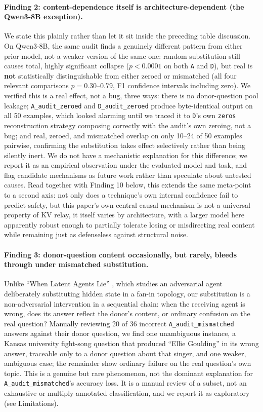 \documentclass[11pt]{article}
\begin{document}
\paragraph{Finding 2: content-dependence itself is architecture-dependent
(the Qwen3-8B exception).} We state this plainly rather than let it sit
inside the preceding table discussion. On Qwen3-8B, the same audit finds
a genuinely different pattern from either prior model, not a weaker
version of the same one: random substitution still causes total, highly
significant collapse ($p<0.0001$ on both \texttt{A} and \texttt{D}), but
real is \textbf{not} statistically distinguishable from either zeroed or
mismatched (all four relevant comparisons $p=0.30$--$0.79$, F1 confidence
intervals including zero). We verified this is a real effect, not a bug,
three ways: there is no donor-question pool leakage; \texttt{A\_audit\_zeroed}
and \texttt{D\_audit\_zeroed} produce byte-identical output on all 50
examples, which looked alarming until we traced it to \texttt{D}'s own
\texttt{zeros} reconstruction strategy composing correctly with the
audit's own zeroing, not a bug; and real, zeroed, and mismatched overlap
on only 10--24 of 50 examples pairwise, confirming the substitution takes
effect selectively rather than being silently inert. We do not have a
mechanistic explanation for this difference; we report it as an empirical
observation under the evaluated model and task, and flag candidate
mechanisms as future work rather than speculate about untested causes.
Read together with Finding 10 below, this extends the same meta-point to
a second axis: not only does a technique's own internal confidence fail
to predict safety, but this paper's own central causal mechanism is not a
universal property of KV relay, it itself varies by architecture, with a
larger model here apparently robust enough to partially tolerate losing
or misdirecting real content while remaining just as defenseless against
structural noise.

\paragraph{Finding 3: donor-question content occasionally, but rarely,
bleeds through under mismatched substitution.} Unlike ``When Latent
Agents Lie'' \citep{latentagentslie2026}, which studies an adversarial
agent deliberately substituting hidden state in a fan-in topology, our
substitution is a non-adversarial intervention in a sequential chain:
when the receiving agent is wrong, does its answer reflect the donor's
content, or ordinary confusion on the real question? Manually reviewing
20 of 36 incorrect \texttt{A\_audit\_mismatched} answers against their
donor question, we find one unambiguous instance, a Kansas university
fight-song question that produced ``Ellie Goulding'' in its wrong answer,
traceable only to a donor question about that singer, and one weaker,
ambiguous case; the remainder show ordinary failure on the real
question's own topic. This is a genuine but rare phenomenon, not the
dominant explanation for \texttt{A\_audit\_mismatched}'s accuracy loss. It
is a manual review of a subset, not an exhaustive or multiply-annotated
classification, and we report it as exploratory (see Limitations).
\end{document}
